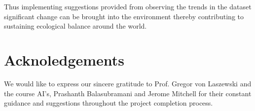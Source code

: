 \documentclass{acm_proc_article-sp}
\begin{document}
Thus implementing suggestions provided from observing the trends in the dataset significant change can be brought into the environment thereby contributing to sustaining ecological balance around the world.

\section{Acknoledgements}

We would like to express our sincere gratitude to Prof. Gregor von Laszewski and the course AI's, Prashanth Balasubramani and Jerome Mitchell for their constant guidance and suggestions throughout the project completion process. 



\end{document}
